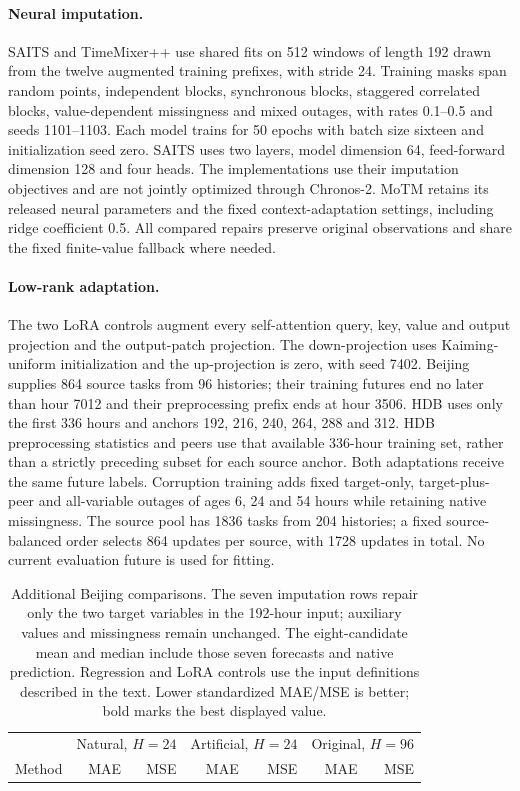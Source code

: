 \paragraph{Neural imputation.}
SAITS and TimeMixer++ use shared fits on 512 windows of length 192 drawn from the twelve augmented training prefixes, with stride 24. Training masks span random points, independent blocks, synchronous blocks, staggered correlated blocks, value-dependent missingness and mixed outages, with rates 0.1--0.5 and seeds 1101--1103. Each model trains for 50 epochs with batch size sixteen and initialization seed zero. SAITS uses two layers, model dimension 64, feed-forward dimension 128 and four heads. The implementations use their imputation objectives and are not jointly optimized through Chronos-2. MoTM retains its released neural parameters and the fixed context-adaptation settings, including ridge coefficient 0.5. All compared repairs preserve original observations and share the fixed finite-value fallback where needed.

\paragraph{Low-rank adaptation.}
The two LoRA controls augment every self-attention query, key, value and output projection and the output-patch projection. The down-projection uses Kaiming-uniform initialization and the up-projection is zero, with seed 7402. Beijing supplies 864 source tasks from 96 histories; their training futures end no later than hour 7012 and their preprocessing prefix ends at hour 3506. HDB uses only the first 336 hours and anchors 192, 216, 240, 264, 288 and 312. HDB preprocessing statistics and peers use that available 336-hour training set, rather than a strictly preceding subset for each source anchor. Both adaptations receive the same future labels. Corruption training adds fixed target-only, target-plus-peer and all-variable outages of ages 6, 24 and 54 hours while retaining native missingness. The source pool has 1836 tasks from 204 histories; a fixed source-balanced order selects 864 updates per source, with 1728 updates in total. No current evaluation future is used for fitting.

\begin{table}[t]
\caption{Additional Beijing comparisons. The seven imputation rows repair only the two target variables in the 192-hour input; auxiliary values and missingness remain unchanged. The eight-candidate mean and median include those seven forecasts and native prediction. Regression and LoRA controls use the input definitions described in the text. Lower standardized MAE/MSE is better; bold marks the best displayed value.}
\label{tab:additional}
\centering\footnotesize
\setlength{\tabcolsep}{3.6pt}
\begin{tabular}{lrrrrrr}
\toprule
 & \multicolumn{2}{c}{Natural, $H=24$} & \multicolumn{2}{c}{Artificial, $H=24$} & \multicolumn{2}{c}{Original, $H=96$}\\
Method & MAE & MSE & MAE & MSE & MAE & MSE\\
\midrule

\end{tabular}
\end{table}

